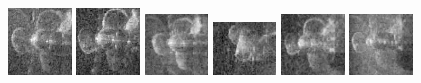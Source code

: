 \begin{figure}
    \includegraphics[width=0.15\textwidth]{chapters/images/dataset/all-class-images/propeler/propeler-57.jpg}
    \includegraphics[width=0.15\textwidth]{chapters/images/dataset/all-class-images/propeler/propeler-66.jpg}
    \includegraphics[width=0.15\textwidth]{chapters/images/dataset/all-class-images/propeler/propeler-102.jpg}
    \includegraphics[width=0.15\textwidth]{chapters/images/dataset/all-class-images/propeler/propeler-124.jpg}
    \includegraphics[width=0.15\textwidth]{chapters/images/dataset/all-class-images/propeler/propeler-75.jpg}
    \includegraphics[width=0.15\textwidth]{chapters/images/dataset/all-class-images/propeler/propeler-79.jpg}
    

\end{figure}
